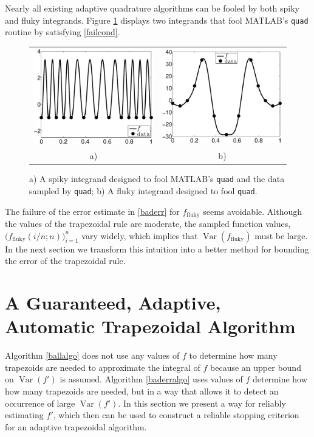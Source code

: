 \documentclass[]{article}
\DeclareMathOperator{\Var}{Var}
\theoremstyle{definition}
\theoremstyle{remark}
\begin{document}
Nearly all existing adaptive quadrature algorithms can be fooled by both spiky and fluky integrands.  Figure \ref{fig:foolquad} displays two integrands that fool MATLAB's {\tt quad} routine by satisfying \eqref{failcond}.

\begin{figure}
\centering 
\begin{tabular}{cc}
\includegraphics[width=5.5cm]{ExpositoryPaperSpikyquad.eps}
&
\includegraphics[width=5.5cm]{ExpositoryPaperFlukyquad.eps} \\
a) & b)
\end{tabular}
\caption{a) A spiky integrand designed to fool MATLAB's {\tt quad} and the data sampled by {\tt quad}; b) A fluky integrand designed to fool {\tt quad}. \label{fig:foolquad}}
\end{figure}

The failure of the error estimate in \eqref{baderr} for $f_{\text{fluky}}$ seems avoidable. Although the values of the trapezoidal rule are moderate, the sampled function values, $\bigl(f_{\text{fluky}}(i/n;n)\bigr)_{i=1}^{n}$ vary widely, which implies that $\Var(f_{\text{fluky}})$ must be large.  In the next section we transform this intuition into a better method for bounding the error of the trapezoidal rule.


\section{A Guaranteed, Adaptive, Automatic Trapezoidal Algorithm} \label{newalgosec}

Algorithm \ref{ballalgo} does not use any values of $f$ to determine how many trapezoids are needed to approximate the integral of $f$ because an upper bound on $\Var(f')$ is assumed.  Algorithm \ref{baderralgo} uses values of $f$ determine how how many trapezoids are needed, but in a way that allows it to detect an occurrence of large $\Var(f')$.  In this section we present a way for reliably estimating $f'$, which then can be used to construct a reliable stopping criterion for an adaptive trapezoidal algorithm.
\end{document}
